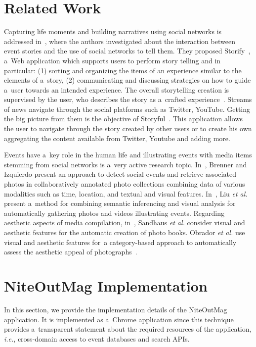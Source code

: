 \documentclass[runningheads,a4paper]{llncs}
\begin{document}
{\section{Related Work}                                                      \label{sec:related-work}
Capturing life moments and building narratives using social networks is addressed in~\cite{Atosy2011}, where the authors investigated about the interaction between event stories and the use of social networks to tell them. They proposed Storify~\cite{Storify2012}, a~Web application which supports users to perform story telling and in particular: (1) sorting and organizing the items of an experience similar to the elements of a~story, (2) communicating and discussing strategies on how to guide a~user towards an intended experience. The overall storytelling creation is supervised by the user, who describes the story as a~crafted experience~\cite{Hassenzahl2010}. Streams of news navigate through the social platforms such as Twitter, YouTube. Getting the big picture from them is the objective of Storyful~\cite{Storyful2012}. This application allows the user to navigate through the story created by other users or to create his own aggregating the content available from Twitter, Youtube and adding more.

Events have a~key role in the human life and illustrating events with media items stemming from social networks is a~very active research topic. In~\cite{Brenner2012}, Brenner and Izquierdo present an approach to detect social events and retrieve associated photos in collaboratively annotated photo collections combining data of various modalities such as time, location, and textual and visual features. In~\cite{Liu2011}, Liu \emph{et al.} present a~method for combining semantic inferencing and visual analysis for automatically gathering photos and videos illustrating events. Regarding aesthetic aspects of media compilation, in~\cite{Sandhaus2011}, Sandhaus \emph{et al.} consider visual and aesthetic features for the automatic creation of photo books. Obrador \emph{et al.} use visual and aesthetic features for~a category-based approach to automatically assess the aesthetic appeal of photographs~\cite{Obrador2012}.


\section{NiteOutMag Implementation}                                                    \label{sec:implementation}
In this section, we provide the implementation details of the NiteOutMag application. It is implemented as a~Chrome application since this technique provides a~transparent statement about the required resources of the application, \emph{i.e.}, cross-domain access to event databases and search APIs.

}
\end{document}
